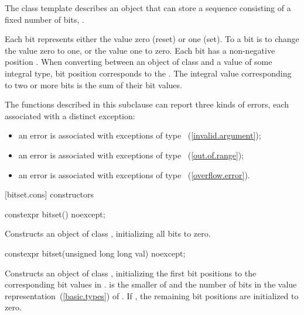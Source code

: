 \pnum
The class template
%
describes an object that can store a sequence consisting of a fixed number of
bits, .

\pnum
Each bit represents either the value zero (reset) or one (set).
To
a bit is to change the value zero to one, or the value one to
zero.
Each bit has a non-negative position .
When converting
between an object of class
and a value of some
integral type, bit position  corresponds to the
.
The integral value corresponding to two
or more bits is the sum of their bit values.

\pnum
The functions described in this subclause can report three kinds of
errors, each associated with a distinct exception:

\begin{itemize}
\item
an
error is associated with exceptions of type
~(\ref{invalid.argument});
%
\item
an
error is associated with exceptions of type
~(\ref{out.of.range});
%
\item
an
error is associated with exceptions of type
~(\ref{overflow.error}).
%
\end{itemize}

[bitset.cons]{ constructors}

%
\begin{itemdecl}
constexpr bitset() noexcept;
\end{itemdecl}

\begin{itemdescr}
\pnum
\effects
Constructs an object of class
,
initializing all bits to zero.
\end{itemdescr}

%
\begin{itemdecl}
constexpr bitset(unsigned long long val) noexcept;
\end{itemdecl}

\begin{itemdescr}
\pnum
\effects
Constructs an object of class
,
initializing the first  bit positions to the corresponding bit
values in .
 is the smaller of  and the number of bits in the value
representation~(\ref{basic.types}) of .
If , the remaining bit positions are initialized to zero.
\end{itemdescr}

